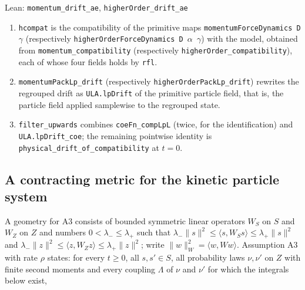 \documentclass[11pt,a4paper]{report}
\begin{document}
\begin{leanbox}{Lean: \texttt{momentum\_\allowbreak{}drift\_\allowbreak{}ae}, \texttt{higherOrder\_\allowbreak{}drift\_\allowbreak{}ae}}
\begin{enumerate}


\item \texttt{hcompat} is the compatibility of the primitive maps \texttt{momentum\allowbreak{}Force\allowbreak{}Dynamics D \ensuremath{\gamma}} (respectively \texttt{higher\allowbreak{}Order\allowbreak{}Force\allowbreak{}Dynamics D \ensuremath{\alpha} \ensuremath{\gamma}}) with the model, obtained from \texttt{momentum\_\allowbreak{}compatibility} (respectively \texttt{higher\allowbreak{}Order\_\allowbreak{}compatibility}), each of whose four fields holds by \texttt{rfl}.

\item \texttt{momentum\allowbreak{}Pack\allowbreak{}Lp\_\allowbreak{}drift} (respectively \texttt{higher\allowbreak{}Order\allowbreak{}Pack\allowbreak{}Lp\_\allowbreak{}drift}) rewrites the regrouped drift as \texttt{ULA.\allowbreak{}lp\allowbreak{}Drift} of the primitive particle field, that is, the particle field applied samplewise to the regrouped state.

\item \texttt{filter\_\allowbreak{}upwards} combines \texttt{coe\allowbreak{}Fn\_\allowbreak{}comp\allowbreak{}Lp\allowbreak{}L} (twice, for the identification) and \texttt{ULA.\allowbreak{}lp\allowbreak{}Drift\_\allowbreak{}coe}; the remaining pointwise identity is \texttt{physical\_\allowbreak{}drift\_\allowbreak{}of\_\allowbreak{}compatibility} at \(t=0\).

\end{enumerate}
\end{leanbox}
\subsection{\texorpdfstring{A contracting metric for the kinetic particle system}{A contracting metric for the kinetic particle system}}


A geometry for A3 consists of bounded symmetric linear operators \(W_S\) on \(S\) and \(W_Z\) on \(Z\) and numbers \(0<\lambda_-\le\lambda_+\) such that \(\lambda_-\|s\|^2\le\langle s,W_Ss\rangle\le\lambda_+\|s\|^2\) and \(\lambda_-\|z\|^2\le\langle z,W_Zz\rangle\le\lambda_+\|z\|^2\); write \(\|w\|_W^2=\langle w,Ww\rangle\). Assumption A3 with rate \(\rho\) states: for every \(t\ge0\), all \(s,s'\in S\), all probability laws \(\nu,\nu'\) on \(Z\) with finite second moments and every coupling \(\Lambda\) of \(\nu\) and \(\nu'\) for which the integrals below exist,
\end{document}
